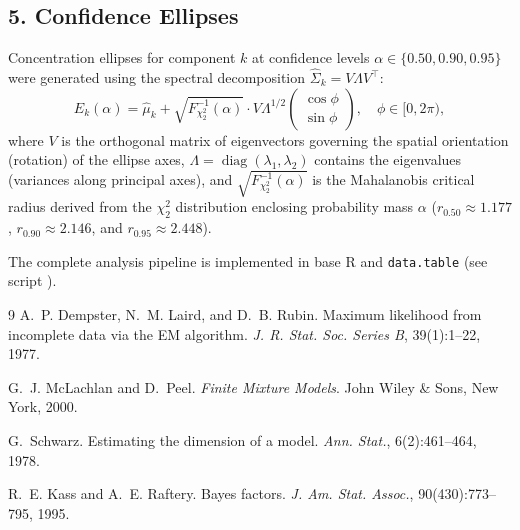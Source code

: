 \documentclass[11pt,a4paper]{article}
\begin{document}
\subsection*{5. Confidence Ellipses}
Concentration ellipses for component $k$ at confidence levels $\alpha \in \{0.50, 0.90, 0.95\}$ were generated using the spectral decomposition $\hat{\Sigma}_k = V \Lambda V^\top$:
\begin{equation}
E_k(\alpha) = \hat{\mu}_k + \sqrt{F_{\chi_2^2}^{-1}(\alpha)} \cdot V \Lambda^{1/2} \begin{pmatrix} \cos \phi \\ \sin \phi \end{pmatrix}, \quad \phi \in [0, 2\pi),
\end{equation}
where $V$ is the orthogonal matrix of eigenvectors governing the spatial orientation (rotation) of the ellipse axes, $\Lambda = \operatorname{diag}(\lambda_1, \lambda_2)$ contains the eigenvalues (variances along principal axes), and $\sqrt{F_{\chi_2^2}^{-1}(\alpha)}$ is the Mahalanobis critical radius derived from the $\chi_2^2$ distribution enclosing probability mass $\alpha$ ($r_{0.50} \approx 1.177$, $r_{0.90} \approx 2.146$, and $r_{0.95} \approx 2.448$).

The complete analysis pipeline is implemented in base R and \texttt{data.table} (see script ).

\footnotesize
\begin{thebibliography}{9}
\setlength{\itemsep}{-1pt}
\setlength{\parskip}{0pt}
A.~P. Dempster, N.~M. Laird, and D.~B. Rubin.
Maximum likelihood from incomplete data via the EM algorithm.
\textit{J. R. Stat. Soc. Series B}, 39(1):1--22, 1977.

G.~J. McLachlan and D.~Peel.
\textit{Finite Mixture Models}.
John Wiley \& Sons, New York, 2000.

G.~Schwarz.
Estimating the dimension of a model.
\textit{Ann. Stat.}, 6(2):461--464, 1978.

R.~E. Kass and A.~E. Raftery.
Bayes factors.
\textit{J. Am. Stat. Assoc.}, 90(430):773--795, 1995.
\end{thebibliography}
\end{document}
